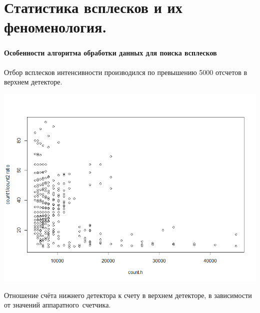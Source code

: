 \documentclass[t, aspectratio=43]{beamer}
\begin{document}
\section{Статистика всплесков и их феноменология. }
\begin{frame}	
\frametitle{\insertsection} 
\framesubtitle{Особенности алгоритма обработки данных для поиска всплесков}
{\tiny Отбор всплесков интенсивности производился по превышению 5000 отсчетов в верхнем детекторе.  }
\begin{center}
	\includegraphics[width=0.7\linewidth]{images/Rplot11}
\end{center}
{\tiny Отношение счёта нижнего детектора к счету в верхнем детекторе, в зависимости от значений аппаратного~счетчика. }
\end{frame}
\end{document}
